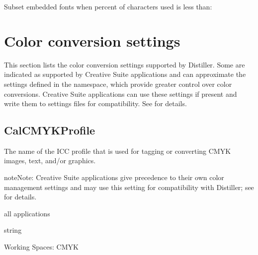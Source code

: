 \documentclass[letterpaper,12pt,english,openany,oneside]{sphinxmanual}
\begin{document}
Subset embedded fonts when percent of characters used is less than:




\section{Color conversion settings}
\label{\detokenize{PDF_Create_CommonSettings:color-conversion-settings}}
This section lists the color conversion settings supported by Distiller. Some are indicated as supported by Creative Suite applications and can approximate the settings defined in the  namespace, which provide greater control over color conversions. Creative Suite applications can use these settings if present and write them to settings files for compatibility. See  for details.




\subsection{CalCMYKProfile}
\label{\detokenize{PDF_Create_CommonSettings:calcmykprofile}}
The name of the ICC profile that is used for tagging or converting CMYK images, text, and/or graphics.

\begin{sphinxadmonition}{note}{Note:}
Creative Suite applications give precedence to their own color management settings and may use this setting for compatibility with Distiller; see  for details.
\end{sphinxadmonition}
\label{\detokenize{PDF_Create_CommonSettings:supported-by-74}}

all applications

\label{\detokenize{PDF_Create_CommonSettings:type-73}}

string

\label{\detokenize{PDF_Create_CommonSettings:ui-name-60}}

Working Spaces: CMYK

\label{\detokenize{PDF_Create_CommonSettings:default-value-69}}

\begin{sphinxVerbatim}[commandchars=\\\{\}]
    
\end{sphinxVerbatim}
\end{document}
